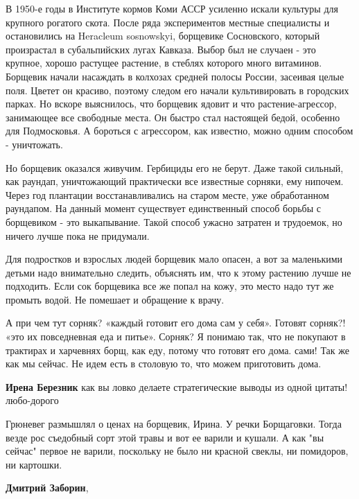\begin{itemize}
\begin{multicols}{2}
В 1950-е годы в Институте кормов Коми АССР усиленно искали культуры для
крупного рогатого скота. После ряда экспериментов местные специалисты и
остановились на Heracleum sosnowskyi, борщевике Сосновского, который
произрастал в субальпийских лугах Кавказа. Выбор был не случаен - это крупное,
хорошо растущее растение, в стеблях которого много витаминов. Борщевик начали
насаждать в колхозах средней полосы России, засеивая целые поля. Цветет он
красиво, поэтому следом его начали культивировать в городских парках. Но вскоре
выяснилось, что борщевик ядовит и что растение-агрессор, занимающее все
свободные места. Он быстро стал настоящей бедой, особенно для Подмосковья. А
бороться с агрессором, как известно, можно одним способом - уничтожать.

Но борщевик оказался живучим. Гербициды его не берут. Даже такой сильный, как
раундап, уничтожающий практически все известные сорняки, ему нипочем. Через год
плантации восстанавливались на старом месте, уже обработанном раундапом. На
данный момент существует единственный способ борьбы с борщевиком - это
выкапывание. Такой способ ужасно затратен и трудоемок, но ничего лучше пока не
придумали.

Для подростков и взрослых людей борщевик мало опасен, а вот за маленькими
детьми надо внимательно следить, объяснять им, что к этому растению лучше не
подходить. Если сок борщевика все же попал на кожу, это место надо тут же
промыть водой. Не помешает и обращение к врачу.
\end{multicols}


А при чем тут сорняк? «каждый готовит его дома сам у себя». Готовят сорняк?!
«это их повседневная еда и питье». Сорняк? Я понимаю так, что не покупают в
трактирах и харчевнях борщ, как еду, потому что готовят его дома. сами! Так же
как мы сейчас. Не идем есть в столовую то, что можем приготовить дома.

\begin{itemize} %
\textbf{Ирена Березник} как вы ловко делаете стратегические выводы из одной цитаты! любо-дорого


Грюневег размышлял о ценах на борщевик, Ирина. У речки Борщаговки. Тогда везде
рос съедобный сорт этой травы и вот ее варили и кушали. А как "вы сейчас"
первое не варили, поскольку не было ни красной свеклы, ни помидоров, ни
картошки.

\textbf{Дмитрий Заборин},


\end{itemize}
\end{itemize}
